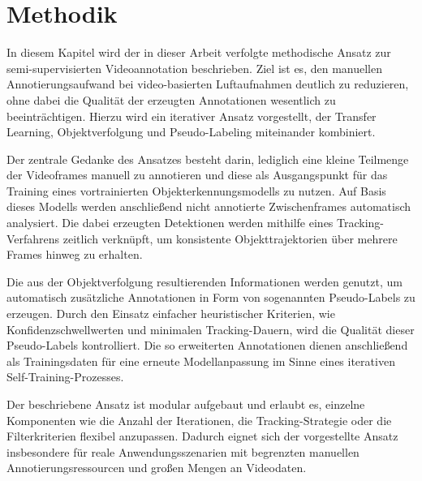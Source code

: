 \section{Methodik}
\label{sec:method}

In diesem Kapitel wird der in dieser Arbeit verfolgte methodische Ansatz zur
semi-supervisierten Videoannotation beschrieben. Ziel ist es, den manuellen
Annotierungsaufwand bei video-basierten Luftaufnahmen deutlich zu reduzieren,
ohne dabei die Qualität der erzeugten Annotationen wesentlich zu beeinträchtigen.
Hierzu wird ein iterativer Ansatz vorgestellt, der Transfer Learning,
Objektverfolgung und Pseudo-Labeling miteinander kombiniert.

Der zentrale Gedanke des Ansatzes besteht darin, lediglich eine kleine Teilmenge
der Videoframes manuell zu annotieren und diese als Ausgangspunkt für das Training
eines vortrainierten Objekterkennungsmodells zu nutzen. Auf Basis dieses Modells
werden anschließend nicht annotierte Zwischenframes automatisch analysiert. Die
dabei erzeugten Detektionen werden mithilfe eines Tracking-Verfahrens zeitlich
verknüpft, um konsistente Objekttrajektorien über mehrere Frames hinweg zu
erhalten.

Die aus der Objektverfolgung resultierenden Informationen werden genutzt, um
automatisch zusätzliche Annotationen in Form von sogenannten Pseudo-Labels zu
erzeugen. Durch den Einsatz einfacher heuristischer Kriterien, wie
Konfidenzschwellwerten und minimalen Tracking-Dauern, wird die Qualität dieser
Pseudo-Labels kontrolliert. Die so erweiterten Annotationen dienen anschließend
als Trainingsdaten für eine erneute Modellanpassung im Sinne eines iterativen
Self-Training-Prozesses.

Der beschriebene Ansatz ist modular aufgebaut und erlaubt es, einzelne
Komponenten wie die Anzahl der Iterationen, die Tracking-Strategie oder die
Filterkriterien flexibel anzupassen. Dadurch eignet sich der vorgestellte
Ansatz insbesondere für reale Anwendungsszenarien mit begrenzten manuellen
Annotierungsressourcen und großen Mengen an Videodaten.


\newpage

\usetikzlibrary{shapes.geometric, arrows.meta, positioning, calc}

